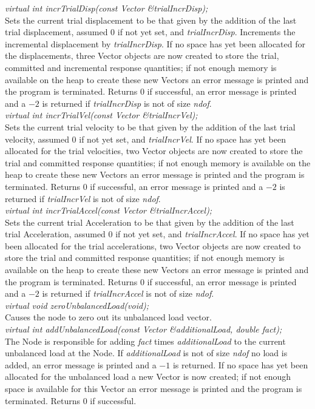{\em virtual int incrTrialDisp(const Vector \&trialIncrDisp);} \\
Sets the current trial displacement to be that given by the addition
of the last trial displacement, assumed $0$ if not yet set, and {\em
trialIncrDisp}. Increments the incremental displacement by {\em trialIncrDisp}.
If no space has yet been allocated for the displacements, three Vector objects 
are now created to store
the trial, committed and incremental response quantities; if not enough memory 
is available on the heap to create these new Vectors an error message
is printed and the program is terminated. Returns $0$ if successful,
an error message is printed and a $-2$ is returned if {\em
trialIncrDisp} is not of size {\em ndof}. \\

{\em virtual int incrTrialVel(const Vector \&trialIncrVel);} \\
Sets the current trial velocity to be that given by the addition
of the last trial velocity, assumed $0$ if not yet set, and {\em
trialIncrVel}. If no space has yet been allocated for
the trial velocities, two Vector objects are now created to store
the trial and committed response quantities; if not enough memory 
is available on the heap to create these new Vectors an error message
is printed and the program is terminated. Returns $0$ if successful,
an error message is printed and a $-2$ is returned if {\em
trialIncrVel} is not of size {\em ndof}. \\

{\em virtual int incrTrialAccel(const Vector \&trialIncrAccel);} \\
Sets the current trial Acceleration to be that given by the addition
of the last trial Acceleration, assumed $0$ if not yet set, and
{\em trialIncrAccel}.  If no space has yet been allocated for
the trial accelerations, two Vector objects are now created to store
the trial and committed response quantities; if not enough memory 
is available on the heap to create these new Vectors an error message
is printed and the program is terminated. Returns $0$ if successful,
an error message is printed and a $-2$ is returned if {\em
trialIncrAccel} is not of size {\em ndof}. \\

{\em virtual void zeroUnbalancedLoad(void);} \\
Causes the node to zero out its unbalanced load vector. \\

{\em virtual int addUnbalancedLoad(const Vector \&additionalLoad, double fact);} \\
The Node is responsible for adding {\em fact} times {\em
additionalLoad} to the current unbalanced load at the Node. If {\em
additionalLoad} is not of size {\em ndof} no load is added, an error
message is printed and a $-1$ is returned. If no space has yet been
allocated for the unbalanced load a new Vector is now created;  
if not enough space is available for this Vector an error message is
printed and the program is terminated. Returns $0$ if successful.  \\ 

